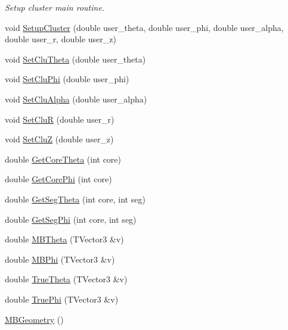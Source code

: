 \begin{DoxyCompactItemize}
\begin{DoxyCompactList}\small\item\em Setup cluster main routine. \end{DoxyCompactList}\item 
void \hyperlink{class_m_b_geometry_ac3751c8eb94c051b402c30cb14cba462}{Setup\-Cluster} (double user\-\_\-theta, double user\-\_\-phi, double user\-\_\-alpha, double user\-\_\-r, double user\-\_\-z)
\item 
void \hyperlink{class_m_b_geometry_a9a2a8c9609141be92d7ba30e6087aa30}{Set\-Clu\-Theta} (double user\-\_\-theta)
\item 
void \hyperlink{class_m_b_geometry_a74142f84cf6317d52ae39c0e0ff8a87e}{Set\-Clu\-Phi} (double user\-\_\-phi)
\item 
void \hyperlink{class_m_b_geometry_a0d4868b0360a6e5534918a9813540015}{Set\-Clu\-Alpha} (double user\-\_\-alpha)
\item 
void \hyperlink{class_m_b_geometry_a292c4326421c78871667e91c3694ae35}{Set\-Clu\-R} (double user\-\_\-r)
\item 
void \hyperlink{class_m_b_geometry_aa6b9d54c7157e8c65e2b208fcef8222c}{Set\-Clu\-Z} (double user\-\_\-z)
\item 
double \hyperlink{class_m_b_geometry_a42aa536f15017724812712b0f8a77c12}{Get\-Core\-Theta} (int core)
\item 
double \hyperlink{class_m_b_geometry_a39f685610ae0e68e547a46f8ef992599}{Get\-Core\-Phi} (int core)
\item 
double \hyperlink{class_m_b_geometry_a49cdf742a2902fc85f0b24dfffa554a8}{Get\-Seg\-Theta} (int core, int seg)
\item 
double \hyperlink{class_m_b_geometry_a575ddd6022d2d686a83ebce3195b6c50}{Get\-Seg\-Phi} (int core, int seg)
\item 
double \hyperlink{class_m_b_geometry_af4adfb858000405b21f79a6bf10c3c37}{M\-B\-Theta} (T\-Vector3 \&v)
\item 
double \hyperlink{class_m_b_geometry_a399568d67bb83801ef6a2dbe963a535e}{M\-B\-Phi} (T\-Vector3 \&v)
\item 
double \hyperlink{class_m_b_geometry_afd393f9db7182de7fb19f0c934edb383}{True\-Theta} (T\-Vector3 \&v)
\item 
double \hyperlink{class_m_b_geometry_a718d9c7fcc4a5fb8b9ecaabdc7a0503f}{True\-Phi} (T\-Vector3 \&v)
\item 
\hypertarget{class_m_b_geometry_a47eba401cd9bb4452df2f812c6a7e446}{\hyperlink{class_m_b_geometry_a47eba401cd9bb4452df2f812c6a7e446}{M\-B\-Geometry} ()}\label{class_m_b_geometry_a47eba401cd9bb4452df2f812c6a7e446}


\end{DoxyCompactItemize}
